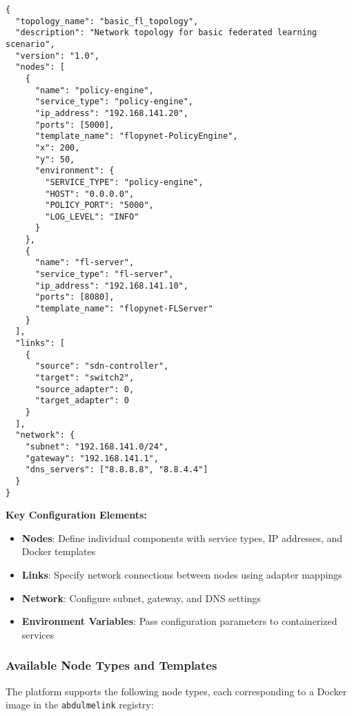 \begin{lstlisting}[style=jsoncode, caption=Basic Topology Structure (basic\_topology.json)]
{
  "topology_name": "basic_fl_topology",
  "description": "Network topology for basic federated learning scenario",
  "version": "1.0",
  "nodes": [
    {
      "name": "policy-engine",
      "service_type": "policy-engine",
      "ip_address": "192.168.141.20",
      "ports": [5000],
      "template_name": "flopynet-PolicyEngine",
      "x": 200,
      "y": 50,
      "environment": {
        "SERVICE_TYPE": "policy-engine",
        "HOST": "0.0.0.0",
        "POLICY_PORT": "5000",
        "LOG_LEVEL": "INFO"
      }
    },
    {
      "name": "fl-server",
      "service_type": "fl-server",
      "ip_address": "192.168.141.10",
      "ports": [8080],
      "template_name": "flopynet-FLServer"
    }
  ],
  "links": [
    {
      "source": "sdn-controller",
      "target": "switch2",
      "source_adapter": 0,
      "target_adapter": 0
    }
  ],
  "network": {
    "subnet": "192.168.141.0/24",
    "gateway": "192.168.141.1",
    "dns_servers": ["8.8.8.8", "8.8.4.4"]
  }
}
\end{lstlisting}

\textbf{Key Configuration Elements:}

\begin{itemize}
    \item \textbf{Nodes}: Define individual components with service types, IP addresses, and Docker templates
    \item \textbf{Links}: Specify network connections between nodes using adapter mappings
    \item \textbf{Network}: Configure subnet, gateway, and DNS settings
    \item \textbf{Environment Variables}: Pass configuration parameters to containerized services
\end{itemize}

\subsubsection{Available Node Types and Templates}

The platform supports the following node types, each corresponding to a Docker image in the \texttt{abdulmelink} registry:

